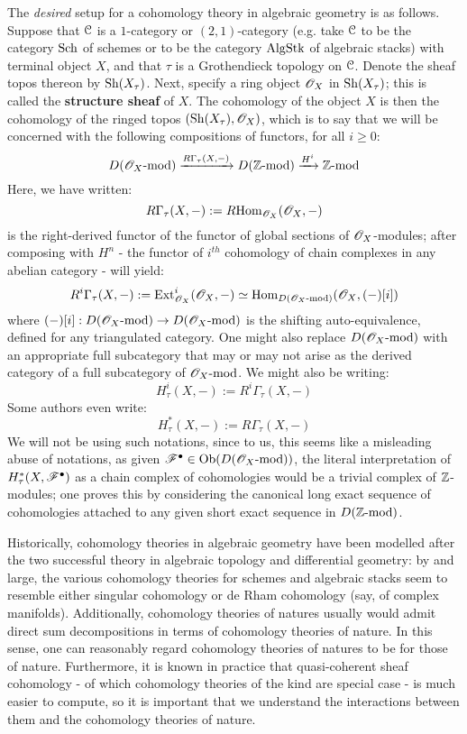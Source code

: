            The \textit{desired} setup for a cohomology theory in algebraic geometry is as follows. Suppose that $\mathcal{C}$ is a $1$-category or $(2, 1)$-category (e.g. take $\mathcal{C}$ to be the category $\mathrm{Sch}$ of schemes or to be the category $\mathrm{Alg}\mathrm{Stk}$ of algebraic stacks) with terminal object $X$, and that $\tau$ is a Grothendieck topology on $\mathcal{C}$. Denote the sheaf topos thereon by $\mathrm{Sh}(X_{\tau})$. Next, specify a ring object $\mathscr{O}_X$ in $\mathrm{Sh}(X_{\tau})$; this is called the \textbf{structure sheaf} of $X$. The cohomology of the object $X$ is then the cohomology of the ringed topos $( \mathrm{Sh}(X_{\tau}), \mathscr{O}_X )$, which is to say that we will be concerned with the following compositions of functors, for all $i \geq 0$:
                $$D(\mathscr{O}_X\text{-}\mathrm{mod}) \xrightarrow[]{R\Gamma_{\tau}(X, -)} D(\mathbb{Z}\text{-}\mathrm{mod}) \xrightarrow[]{H^i} \mathbb{Z}\text{-}\mathrm{mod}$$
            Here, we have written:
                $$R\Gamma_{\tau}(X, -) := R\mathrm{Hom}_{\mathscr{O}_X}(\mathscr{O}_X, -)$$
            is the right-derived functor of the functor of global sections of $\mathscr{O}_X$-modules; after composing with $H^n$ - the functor of $i^{th}$ cohomology of chain complexes in any abelian category - will yield:
                $$R^i\Gamma_{\tau}(X, -) := \mathrm{Ext}^i_{\mathscr{O}_X}(\mathscr{O}_X, -) \simeq \mathrm{Hom}_{D(\mathscr{O}_X\text{-}\mathrm{mod})}(\mathscr{O}_X, (-)[i])$$
            where $(-)[i]: D(\mathscr{O}_X\text{-}\mathrm{mod}) \to D(\mathscr{O}_X\text{-}\mathrm{mod})$ is the shifting auto-equivalence, defined for any triangulated category. One might also replace $D(\mathscr{O}_X\text{-}\mathrm{mod})$ with an appropriate full subcategory that may or may not arise as the derived category of a full subcategory of $\mathscr{O}_X\text{-}\mathrm{mod}$. We might also be writing:
                $$H^i_{\tau}(X, -) := R^i\Gamma_{\tau}(X, -)$$
            Some authors even write:
                $$H^*_{\tau}(X, -) := R\Gamma_{\tau}(X, -)$$
            We will not be using such notations, since to us, this seems like a misleading abuse of notations, as given $\mathscr{F}^{\bullet} \in \mathrm{Ob}( D(\mathscr{O}_X\text{-}\mathrm{mod}) )$, the literal interpretation of $H^*_{\tau}(X, \mathscr{F}^{\bullet})$ as a chain complex of cohomologies would be a trivial complex of $\mathbb{Z}$-modules; one proves this by considering the canonical long exact sequence of cohomologies attached to any given short exact sequence in $D(\mathbb{Z}\text{-}\mathrm{mod})$. 
        
            Historically, cohomology theories in algebraic geometry have been modelled after the two successful theory in algebraic topology and differential geometry: by and large, the various cohomology theories for schemes and algebraic stacks seem to resemble either singular cohomology or de Rham cohomology (say, of complex manifolds). Additionally, cohomology theories of  natures usually would admit direct sum decompositions in terms of cohomology theories of  nature. In this sense, one can reasonably regard cohomology theories of  natures to be  for those of  nature. Furthermore, it is known in practice that quasi-coherent sheaf cohomology - of which cohomology theories of the  kind are special case - is much easier to compute, so it is important that we understand the interactions between them and the cohomology theories of  nature. 
    
